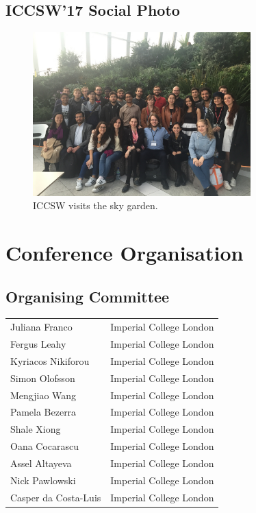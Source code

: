 \documentclass[a4paper,UKenglish]{oasicsmaster-v2016}
\begin{document}
\section*{ICCSW'17 Social Photo}
\begin{figure}[h]
  \centering
  \includegraphics[width=0.75\textwidth]{social.jpg}
  \caption{ICCSW visits the sky garden.}
\end{figure}

\chapter{Conference Organisation}

\section*{Organising Committee}

\begin{tabularx}{\textwidth}{p{}l}
Juliana Franco              & Imperial College London\\
Fergus Leahy                & Imperial College London\\
Kyriacos Nikiforou          & Imperial College London\\
Simon Olofsson              & Imperial College London\\
Mengjiao Wang               & Imperial College London\\
Pamela Bezerra              & Imperial College London\\
Shale Xiong                 & Imperial College London\\
Oana Cocarascu              & Imperial College London\\
Assel Altayeva              & Imperial College London\\
Nick Pawlowski              & Imperial College London\\
Casper da Costa-Luis        & Imperial College London\\
\end{tabularx}
\end{document}
